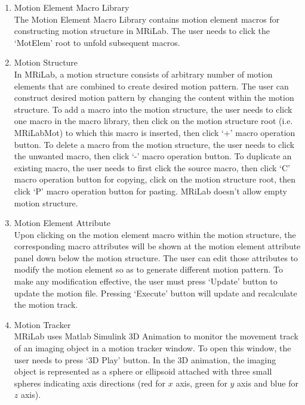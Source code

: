 \documentclass{book}%
\begin{document}
\begin{enumerate}
	\item Motion Element Macro Library \\
	
The Motion Element Macro Library contains motion element macros for constructing motion structure in MRiLab. The user needs to click the `MotElem' root to unfold subsequent macros.	
	
	
	\item Motion Structure \\
	
In MRiLab, a motion structure consists of arbitrary number of motion elements that are combined to create desired motion pattern. The user can construct desired motion pattern by changing the content within the motion structure. To add a macro into the motion structure, the user needs to click one macro in the macro library, then click on the motion structure root (i.e. MRiLabMot) to which this macro is inserted, then click `+' macro operation button. To delete a macro from the motion structure, the user needs to click the unwanted macro, then click `-' macro operation button. To duplicate an existing macro, the user needs to first click the source macro, then click `C' macro operation button for copying, click on the motion structure root, then click `P' macro operation button for pasting. MRiLab doesn't allow empty motion structure.	
	
	
	\item Motion Element Attribute \\
	
Upon clicking on the motion element macro within the motion structure, the corresponding macro attributes will be shown at the motion element attribute panel down below the motion structure. The user can edit those attributes to modify the motion element so as to generate different motion pattern. To make any modification effective, the user must press `Update' button to update the motion file. Pressing `Execute' button will update and recalculate the motion track.		
	
	\item Motion Tracker \\
	
MRiLab uses Matlab Simulink 3D Animation to monitor the movement track of an imaging object in a motion tracker window. To open this window, the user needs to press `3D Play' button.	In the 3D animation, the imaging object is represented as a sphere or ellipsoid attached with three small spheres indicating axis directions (red for $x$ axis, green for $y$ axis and blue for $z$ axis).


\end{enumerate}
\end{document}
